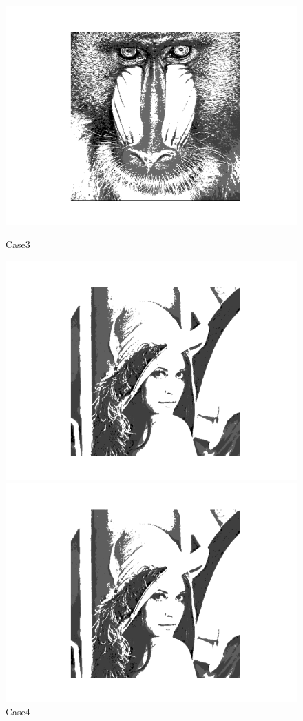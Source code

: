 \documentclass{article}
\begin{document}
\begin{figure}[h]
\begin{minipage}[t]{0.2\textwidth}
		\includegraphics[width=\textwidth]{PSO_3.png}
		\caption{Case3}
	\end{minipage}
	\begin{minipage}[t]{0.2\textwidth}
		\centering
		\includegraphics[width=\textwidth]{PSO_4.png}
		\caption{Case4}
	\end{minipage}
	\begin{minipage}[t]{0.2\textwidth}
		\centering
		\includegraphics[width=\textwidth]{PSO_5.png}

\end{minipage}
\end{figure}
\end{document}
